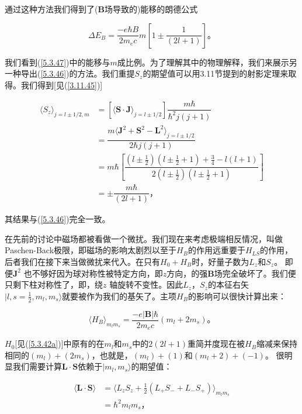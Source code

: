 ﻿\documentclass[UTF8,twoside]{ctexart}
\begin{document}
\noindent 通过这种方法我们得到了($\boldsymbol{B}$场导致的)能移的朗德公式

\begin{equation} \label{5.3.47}
\Delta E_B=\dfrac{-e\hbar B}{2m_ec}m\left[1\pm\dfrac{1}{(2l+1)}\right]\text{。}
\end{equation}

我们看到(\ref{5.3.47})中的能移与$m$成比例。为了理解其中的物理解释，我们来展示另一种导出(\ref{5.3.46})的方法。我们重提$S_z$的期望值可以用3.11节提到的射影定理来取得。我们得到[见(\ref{3.11.45})]

\begin{equation} \label{5.3.48}
\begin{split}
\langle S_z\rangle_{j=l\pm 1/2,m}&=\left[\langle\boldsymbol{S\cdot J}\rangle_{j=l\pm 1/2}\right]\dfrac{m\hbar}{\hbar^2j(j+1)} \\
&= \dfrac{m\langle\boldsymbol{J}^2 +\boldsymbol{S}^2-\boldsymbol{L}^2\rangle_{j=l\pm 1/2}}{2\hbar j(j+1)} \\
&= m\hbar\left[\dfrac{\left(l\pm\frac{1}{2}\right)\left(l\pm\frac{1}{2}+1\right)+ \frac{3}{4}-l(l+1)}{2\left(l\pm \frac{1}{2}\right)\left(l\pm \frac{1}{2}+1\right)}\right] \\
&=\pm\dfrac{m\hbar}{(2l+1)}\text{，}
\end{split}
\end{equation}

\noindent 其结果与(\ref{5.3.46})完全一致。

在先前的讨论中磁场都被看做一个微扰。我们现在来考虑极端相反情况，叫做Paschen-Back极限，即磁场的影响太剧烈以至于$H_B$的作用远重要于$H_{LS}$的作用，后者我们在接下来当做微扰来代入。在只有$H_0+H_B$时，好量子数为$L_z$和$S_z$。 即便$\boldsymbol{J}^2$ 也不够好因为球对称性被特定方向，即$z$方向，的强$\boldsymbol{B}$场完全破坏了。我们便只剩下柱对称性了，即，绕$z$ 轴旋转不变性。因此$L_z$，$S_z$的本征右矢$|l,s=\frac{1}{2},m_l,m_s\rangle$就要被作为我们的基矢了。主项$H_B$的影响可以很快计算出来：

\begin{equation} \label{5.3.49}
\langle H_B\rangle_{m_lm_s}=\dfrac{-e|\boldsymbol{B}|\hbar}{2m_ec}(m_l+2m_s)\text{。}
\end{equation}

\noindent $H_0$[见(\ref{5.3.42a})]中原有的在$m_l$和$m_s$中的$2(2l+1)$重简并度现在被$H_B$缩减来保持相同的$(m_l)+(2m_s)$，也就是，$(m_l)+(1)$和$(m_l+2)+(-1)$。 很明显我们需要计算$\boldsymbol{L\cdot S}$依赖于$|m_l,m_s\rangle$的期望值：

\begin{equation} \label{5.3.50}
\begin{split}
\langle\boldsymbol{L\cdot S}\rangle&= \langle L_zS_z+\frac{1}{2}(L_+S_-+L_-S_+)\rangle_{m_lm_s} \\
&=\hbar^2m_lm_s\text{，}
\end{split}
\end{equation}
\end{document}
